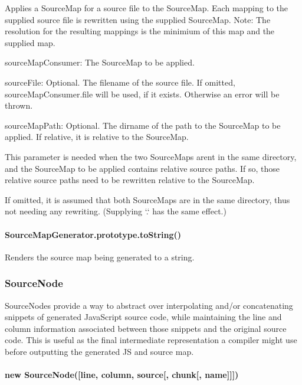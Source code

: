 Applies a Source\+Map for a source file to the Source\+Map. Each mapping to the supplied source file is rewritten using the supplied Source\+Map. Note\+: The resolution for the resulting mappings is the minimium of this map and the supplied map.


\begin{DoxyItemize}
\item {\ttfamily source\+Map\+Consumer}\+: The Source\+Map to be applied.
\item {\ttfamily source\+File}\+: Optional. The filename of the source file. If omitted, source\+Map\+Consumer.\+file will be used, if it exists. Otherwise an error will be thrown.
\item {\ttfamily source\+Map\+Path}\+: Optional. The dirname of the path to the Source\+Map to be applied. If relative, it is relative to the Source\+Map.

This parameter is needed when the two Source\+Maps aren\textquotesingle{}t in the same directory, and the Source\+Map to be applied contains relative source paths. If so, those relative source paths need to be rewritten relative to the Source\+Map.

If omitted, it is assumed that both Source\+Maps are in the same directory, thus not needing any rewriting. (Supplying `\textquotesingle{}.\textquotesingle{}` has the same effect.)
\end{DoxyItemize}

\paragraph*{Source\+Map\+Generator.\+prototype.\+to\+String()}

Renders the source map being generated to a string.

\subsubsection*{Source\+Node}

Source\+Nodes provide a way to abstract over interpolating and/or concatenating snippets of generated Java\+Script source code, while maintaining the line and column information associated between those snippets and the original source code. This is useful as the final intermediate representation a compiler might use before outputting the generated JS and source map.

\paragraph*{new Source\+Node(\mbox{[}line, column, source\mbox{[}, chunk\mbox{[}, name\mbox{]}\mbox{]}\mbox{]})}


